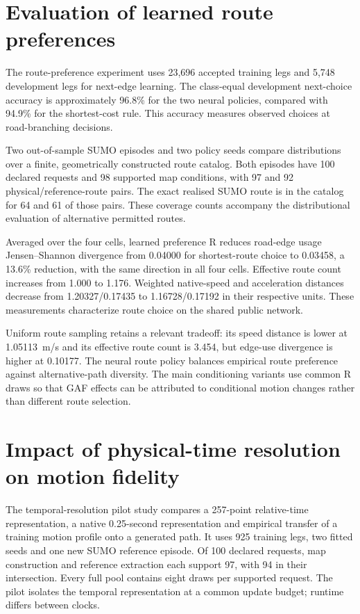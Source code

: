 \section{Evaluation of learned route preferences}
The route-preference experiment uses 23,696 accepted training legs and 5,748 development legs for next-edge learning. The class-equal development next-choice accuracy is approximately 96.8\% for the two neural policies, compared with 94.9\% for the shortest-cost rule. This accuracy measures observed choices at road-branching decisions.

Two out-of-sample SUMO episodes and two policy seeds compare distributions over a finite, geometrically constructed route catalog. Both episodes have 100 declared requests and 98 supported map conditions, with 97 and 92 physical/reference-route pairs. The exact realised SUMO route is in the catalog for 64 and 61 of those pairs. These coverage counts accompany the distributional evaluation of alternative permitted routes.

Averaged over the four cells, learned preference R reduces road-edge usage Jensen--Shannon divergence from 0.04000 for shortest-route choice to 0.03458, a 13.6\% reduction, with the same direction in all four cells. Effective route count increases from 1.000 to 1.176. Weighted native-speed and acceleration distances decrease from 1.20327/0.17435 to 1.16728/0.17192 in their respective units. These measurements characterize route choice on the shared public network.


Uniform route sampling retains a relevant tradeoff: its speed distance is lower at 1.05113~m/s and its effective route count is 3.454, but edge-use divergence is higher at 0.10177. The neural route policy balances empirical route preference against alternative-path diversity. The main conditioning variants use common R draws so that GAF effects can be attributed to conditional motion changes rather than different route selection.

\section{Impact of physical-time resolution on motion fidelity}
The temporal-resolution pilot study compares a 257-point relative-time representation, a native 0.25-second representation and empirical transfer of a training motion profile onto a generated path. It uses 925 training legs, two fitted seeds and one new SUMO reference episode. Of 100 declared requests, map construction and reference extraction each support 97, with 94 in their intersection. Every full pool contains eight draws per supported request. The pilot isolates the temporal representation at a common update budget; runtime differs between clocks.

